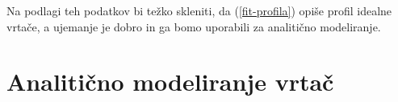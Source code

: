 \documentclass[a4paper, oneside, 12pt]{book}
\begin{document}
        Na podlagi teh podatkov bi težko skleniti, da (\ref{fit-profila}) opiše profil idealne vrtače, a ujemanje je dobro in ga bomo uporabili za analitično modeliranje. 


        \chapter{Analitično modeliranje vrtač}
        \label{analiticno-modeliranje}

\end{document}
